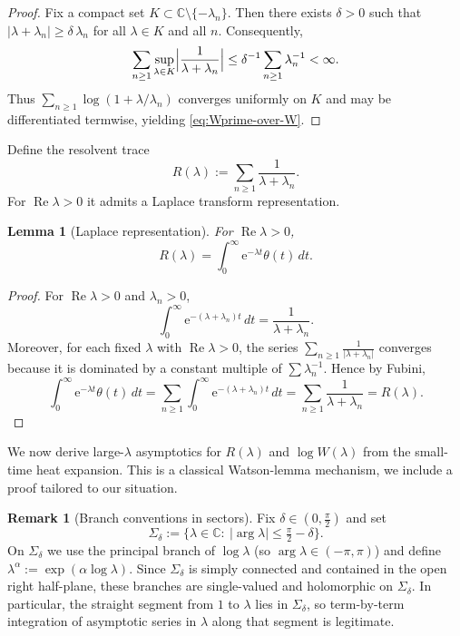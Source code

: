 \documentclass[11pt,letterpaper]{amsart}
\numberwithin{equation}{section}
\newtheorem{lemma}[theorem]{Lemma}
\theoremstyle{definition}
\newtheorem{remark}[theorem]{Remark}
\newcommand{\C}{\mathbb{C}}
\newcommand{\Ree}{\operatorname{Re}}
\newcommand{\e}{\mathrm{e}}
\begin{document}
\begin{proof}
Fix a compact set $K\subset \C\setminus\{-\lambda_n\}$.
Then there exists $\delta>0$ such that $|\lambda+\lambda_n|\ge \delta\,\lambda_n$ for all $\lambda\in K$ and all $n$.
Consequently,
\[
\sum_{n\ge 1}\sup_{\lambda\in K}\Bigl|\frac{1}{\lambda+\lambda_n}\Bigr|
\le \delta^{-1}\sum_{n\ge 1}\lambda_n^{-1}<\infty.
\]
Thus $\sum_{n\ge 1}\log(1+\lambda/\lambda_n)$ converges uniformly on $K$ and may be differentiated termwise,
yielding \eqref{eq:Wprime-over-W}.
\end{proof}

Define the resolvent trace
\[
R(\lambda):=\sum_{n\ge 1}\frac{1}{\lambda+\lambda_n}.
\]
For $\Ree\lambda>0$ it admits a Laplace transform representation.

\begin{lemma}[Laplace representation]\label{lem:laplace-resolvent}
For $\Ree\lambda>0$,
\begin{equation}\label{eq:laplace-resolvent}
R(\lambda)=\int_0^\infty \e^{-\lambda t}\theta(t)\,dt.
\end{equation}
\end{lemma}

\begin{proof}
For $\Ree\lambda>0$ and $\lambda_n>0$,
\[
\int_0^\infty \e^{-(\lambda+\lambda_n)t}\,dt=\frac{1}{\lambda+\lambda_n}.
\]
Moreover, for each fixed $\lambda$ with $\Ree\lambda>0$, the series
$\sum_{n\ge 1} \frac{1}{|\lambda+\lambda_n|}$ converges because it is dominated by a constant multiple of
$\sum \lambda_n^{-1}$. Hence by Fubini,
\[
\int_0^\infty \e^{-\lambda t}\theta(t)\,dt
=\sum_{n\ge 1}\int_0^\infty \e^{-(\lambda+\lambda_n)t}\,dt
=\sum_{n\ge 1}\frac{1}{\lambda+\lambda_n}=R(\lambda).
\]
\end{proof}

We now derive large-$\lambda$ asymptotics for $R(\lambda)$ and $\log W(\lambda)$ from the small-time heat expansion. This is a classical Watson-lemma mechanism, we include a proof tailored to our situation.

\begin{remark}[Branch conventions in sectors]\label{rem:sector-branches}
Fix $\delta\in(0,\tfrac{\pi}{2})$ and set
\[
\Sigma_\delta:=\{\lambda\in\mathbb{C}:\ |\arg\lambda|\le \tfrac{\pi}{2}-\delta\}.
\]
On $\Sigma_\delta$ we use the principal branch of $\log\lambda$ (so $\arg\lambda\in(-\pi,\pi)$)
and define $\lambda^\alpha:=\exp(\alpha\log\lambda)$. Since $\Sigma_\delta$ is simply connected and
contained in the open right half-plane, these branches are single-valued and holomorphic on
$\Sigma_\delta$. In particular, the straight segment from $1$ to $\lambda$ lies in $\Sigma_\delta$,
so term-by-term integration of asymptotic series in $\lambda$ along that segment is legitimate.
\end{remark}
\end{document}
